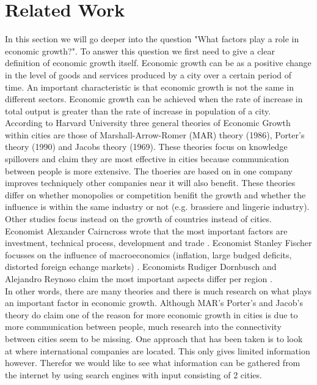 \section{Related Work}
In this section we will go deeper into the question "What factors play a role in economic growth?". To answer this question we first need to give a clear definition of economic growth itself. Economic growth can be as a positive change in the level of goods and services produced by a city over a certain period of time. An important characteristic is that economic growth is not the same in different sectors. Economic growth can be achieved when the rate of increase in total output is greater than the rate of increase in population of a city. \\

According to Harvard University three general theories of Economic Growth within cities \cite{glaeser1992growth} are those of Marshall-Arrow-Romer (MAR) theory (1986), Porter's theory (1990) and Jacobs theory (1969). These theories focus on knowledge spillovers and claim they are most effective in cities because communication between people is more extensive. The thoeries are based on in one company improves techniquely other companies near it will also benefit. These theories differ on whether monopolies or competition benifit the growth and whether the influence is within the same industry or not (e.g. brassiere and lingerie industry). \\
Other studies focus instead on the growth of countries instead of cities. Economist Alexander Cairncross wrote that the most important factors are investment, technical process, development and trade \cite{cairncross2013factors}. Economist Stanley Fischer focusses on the influence of macroeconomics (inflation, large budged deficits, distorted foreign echange markets) \cite{fischer1993role}. Economists Rudiger Dornbusch and Alejandro Reynoso claim the most important aspects differ per region \cite{dornbusch1989financial}. \\
In other words, there are many theories and there is much research on what plays an important factor in economic growth. Although MAR's Porter's and Jacob's theory do claim one of the reason for more economic growth in cities is due to more communication between people, much research into the connectivity between cities seem to be missing. One approach that has been taken is to look at where international companies are located. This only gives limited information however. Therefor we would like to see what information can be gathered from the internet by using search engines with input consisting of 2 cities.